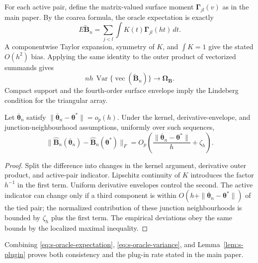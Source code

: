 For each active pair, define the matrix-valued surface moment
$\boldsymbol{\Gamma}_{jl}(v)$ as in the main paper.  By the coarea formula,
the oracle expectation is exactly
\begin{equation}
 E\widetilde{\mathbf{B}}_n
 =\sum_{j<l}\int K(t)\boldsymbol{\Gamma}_{jl}(ht)\,dt.
 \label{eq:s-oracle-expectation}
\end{equation}
A componentwise Taylor expansion, symmetry of $K$, and
$\int K=1$ give the stated $O(h^2)$ bias.  Applying the same identity to the
outer product of vectorized summands gives
\begin{equation}
 nh\,\operatorname{Var}
 \{\operatorname{vec}(\widetilde{\mathbf{B}}_n)\}
 \longrightarrow\boldsymbol{\Omega}_{\mathbf{B}}.
 \label{eq:s-oracle-variance}
\end{equation}
Compact support and the fourth-order surface envelope imply the Lindeberg
condition for the triangular array.

\begin{lemma}
\label{lem:s-plugin}
Let $\overline{\boldsymbol{\theta}}_n$ satisfy
$\|\overline{\boldsymbol{\theta}}_n-\boldsymbol{\theta}^*\|=o_p(h)$.
Under the kernel, derivative-envelope, and junction-neighbourhood assumptions,
uniformly over such sequences,
\begin{equation}
 \|\widehat{\mathbf{B}}_n(\overline{\boldsymbol{\theta}}_n)
   -\widehat{\mathbf{B}}_n(\boldsymbol{\theta}^*)\|_F
 =O_p\!\left(
 \frac{\|\overline{\boldsymbol{\theta}}_n
             -\boldsymbol{\theta}^*\|}{h}+\zeta_h
 \right).
 \label{eq:s-plugin}
\end{equation}
\end{lemma}

\begin{proof}
Split the difference into changes in the kernel argument, derivative outer
product, and active-pair indicator.  Lipschitz continuity of $K$ introduces
the factor $h^{-1}$ in the first term.  Uniform derivative envelopes control
the second.  The active indicator can change only if a third component is
within $O(h+\|\overline{\boldsymbol{\theta}}_n-
\boldsymbol{\theta}^*\|)$ of the tied pair; the normalized contribution of
these junction neighbourhoods is bounded by $\zeta_h$ plus the first term.
The empirical deviations obey the same bounds by the localized maximal
inequality.
\end{proof}

Combining \eqref{eq:s-oracle-expectation},
\eqref{eq:s-oracle-variance}, and Lemma~\ref{lem:s-plugin} proves both
consistency and the plug-in rate stated in the main paper.
